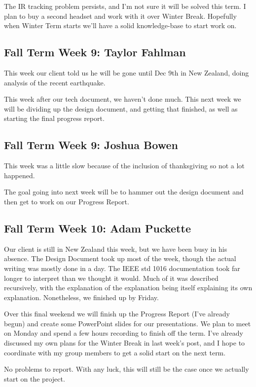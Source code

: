 \documentclass[draftclsnofoot,onecolumn]{IEEEtran}
\begin{document}
The IR tracking problem persists, and I'm not sure it will be solved this term. I plan to buy a second headset and work with it over Winter Break. Hopefully when Winter Term starts we'll have a solid knowledge-base to start work on.

\subsection{Fall Term Week 9: Taylor Fahlman}

This week our client told us he will be gone until Dec 9th in New Zealand, doing analysis of the recent earthquake.

This week after our tech document, we haven't done much. This next week we will be dividing up the design document, and getting that finished, as well as starting the final progress report.

\subsection{Fall Term Week 9: Joshua Bowen}

This week was a little slow because of the inclusion of thanksgiving so not a lot happened.

The goal going into next week will be to hammer out the design document and then get to work on our Progress Report.

\subsection{Fall Term Week 10: Adam Puckette}

Our client is still in New Zealand this week, but we have been busy in his absence. The Design Document took up most of the week, though the actual writing was mostly done in a day. The IEEE std 1016 documentation took far longer to interpret than we thought it would. Much of it was described recursively, with the explanation of the explanation being itself explaining its own explanation. Nonetheless, we finished up by Friday.

Over this final weekend we will finish up the Progress Report (I've already begun) and create some PowerPoint slides for our presentations. We plan to meet on Monday and spend a few hours recording to finish off the term. I've already discussed my own plans for the Winter Break in last week's post, and I hope to coordinate with my group members to get a solid start on the next term.

No problems to report. With any luck, this will still be the case once we actually start on the project.
\end{document}
